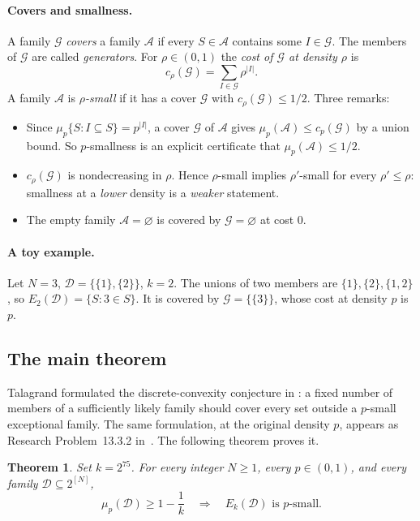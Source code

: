 \documentclass[11pt,letterpaper]{article}
\newtheorem{theorem}{Theorem}[section]
\theoremstyle{definition}
\theoremstyle{remark}
\numberwithin{equation}{section}
\begin{document}
\paragraph{Covers and smallness.}
A family $\mathcal G$ \emph{covers} a family $\mathcal A$ if every
$S\in\mathcal A$ contains some $I\in\mathcal G$. The members of
$\mathcal G$ are called \emph{generators}. For $\rho\in(0,1)$ the
\emph{cost of $\mathcal G$ at density $\rho$} is
\[
c_\rho(\mathcal G)=\sum_{I\in\mathcal G}\rho^{|I|}.
\]
A family $\mathcal A$ is \emph{$\rho$-small} if it has a cover
$\mathcal G$ with $c_\rho(\mathcal G)\le1/2$. Three remarks:
\begin{itemize}
\item Since $\mu_p\{S:I\subseteq S\}=p^{|I|}$, a cover $\mathcal G$ of
$\mathcal A$ gives $\mu_p(\mathcal A)\le c_p(\mathcal G)$ by a union bound.
So $p$-smallness is an explicit certificate that $\mu_p(\mathcal A)\le1/2$.
\item $c_\rho(\mathcal G)$ is nondecreasing in $\rho$. Hence
$\rho$-small implies $\rho'$-small for every $\rho'\le\rho$:
smallness at a \emph{lower} density is a \emph{weaker} statement.
\item The empty family $\mathcal A=\varnothing$ is covered by
$\mathcal G=\varnothing$ at cost $0$.
\end{itemize}

\paragraph{A toy example.}
Let $N=3$, $\mathcal D=\{\{1\},\{2\}\}$, $k=2$. The unions of two members
are $\{1\},\{2\},\{1,2\}$, so $E_2(\mathcal D)=\{S:3\in S\}$. It is
covered by $\mathcal G=\{\{3\}\}$, whose cost at density $p$ is $p$.

\subsection{The main theorem}

Talagrand formulated the discrete-convexity conjecture in
\cite[Conjecture~7.1]{Talagrand10}: a fixed number of members of a
sufficiently likely family should cover every set outside a $p$-small
exceptional family. The same formulation, at the original density $p$,
appears as Research Problem~13.3.2 in~\cite{Talagrand21}. The following
theorem proves it.

\begin{theorem}
\label{thm:main}
Set $k=2^{75}$. For every integer $N\ge1$, every $p\in(0,1)$, and every
family $\mathcal D\subseteq2^{[N]}$,
\[
\mu_p(\mathcal D)\ge1-\frac1k
\quad\Longrightarrow\quad
E_k(\mathcal D)\text{ is }p\text{-small}.
\]
\end{theorem}
\end{document}
